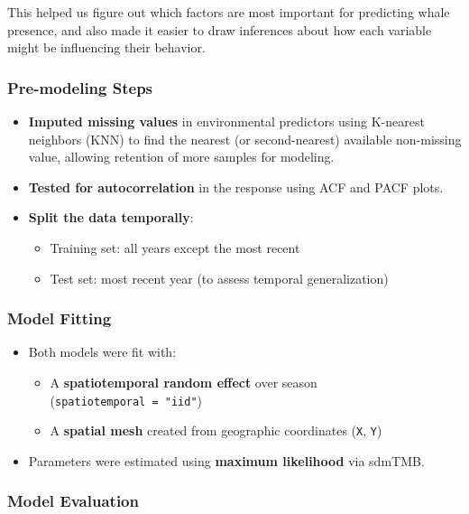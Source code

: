 \documentclass[
]{article}
\providecommand{\tightlist}{%
  \setlength{\itemsep}{0pt}\setlength{\parskip}{0pt}}
\begin{document}
This helped us figure out which factors are most important for
predicting whale presence, and also made it easier to draw inferences
about how each variable might be influencing their behavior.

\subsubsection{Pre-modeling Steps}\label{pre-modeling-steps}

\begin{itemize}
\tightlist
\item
  \textbf{Imputed missing values} in environmental predictors using
  K-nearest neighbors (KNN) to find the nearest (or second-nearest)
  available non-missing value, allowing retention of more samples for
  modeling.
\item
  \textbf{Tested for autocorrelation} in the response using ACF and PACF
  plots.
\item
  \textbf{Split the data temporally}:

  \begin{itemize}
  \tightlist
  \item
    Training set: all years except the most recent
  \item
    Test set: most recent year (to assess temporal generalization)
  \end{itemize}
\end{itemize}

\subsubsection{Model Fitting}\label{model-fitting}

\begin{itemize}
\tightlist
\item
  Both models were fit with:

  \begin{itemize}
  \tightlist
  \item
    A \textbf{spatiotemporal random effect} over season
    (\texttt{spatiotemporal\ =\ "iid"})
  \item
    A \textbf{spatial mesh} created from geographic coordinates
    (\texttt{X}, \texttt{Y})
  \end{itemize}
\item
  Parameters were estimated using \textbf{maximum likelihood} via
  sdmTMB.
\end{itemize}

\subsubsection{Model Evaluation}\label{model-evaluation}
\end{document}
